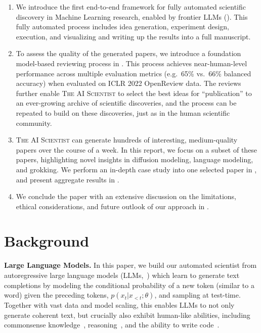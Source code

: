 \documentclass[11pt, a4paper]{include/gdm_format}
\newcommand{\ouralgo}{\textsc{The AI Scientist}\xspace}
\begin{document}
\begin{enumerate}
\item We introduce the first end-to-end framework for fully automated scientific discovery in Machine Learning research, enabled by frontier LLMs (). This fully automated process includes idea generation, experiment design, execution, and visualizing and writing up the results into a full manuscript.
\item To assess the quality of the generated papers, we introduce a foundation model-based reviewing process in . This process achieves near-human-level performance across multiple evaluation metrics (e.g.\ 65\% vs.\ 66\% balanced accuracy) when evaluated on ICLR 2022 OpenReview data. The reviews further enable \ouralgo to select the best ideas for ``publication'' to an ever-growing archive of scientific discoveries, and the process can be repeated to build on these discoveries, just as in the human scientific community.
%
\item \ouralgo can generate hundreds of interesting, medium-quality papers over the course of a week.
In this report, we focus on a subset of these papers, highlighting novel insights in diffusion modeling, language modeling, and grokking.
We perform an in-depth case study into one selected paper in , and present aggregate results in .
\item We conclude the paper with an extensive discussion on the limitations, ethical considerations, and future outlook of our approach in .
\end{enumerate}

%

\section{Background}
\label{sec:background}

\textbf{Large Language Models.}
In this paper, we build our automated scientist from autoregressive large language models (LLMs,~\citet{gpt4, geminiteam2023gemini, claude2, llama3, zhu2024deepseek}) which learn to generate text completions by modeling the conditional probability of a new token (similar to a word) given the preceding tokens, $p(x_t | x_{<t}; \theta)$, and sampling at test-time.
Together with vast data and model scaling, this enables LLMs to not only generate coherent text, but crucially also exhibit human-like abilities, including commonsense knowledge~\citep{talmor2019commonsense}, reasoning~\citep{wei2022chain}, and the ability to write code~\citep{codex, xu2022systematic}.
\end{document}
